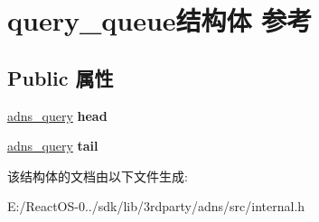 \hypertarget{structquery__queue}{}\section{query\+\_\+queue结构体 参考}
\label{structquery__queue}
\subsection*{Public 属性}
\begin{DoxyCompactItemize}
\item 
\mbox{\label{structquery__queue_a4590cbaffc45be372c9bc08a0864f5cc}} 
\hyperlink{structadns____query}{adns\+\_\+query} {\bfseries head}
\item 
\mbox{\label{structquery__queue_a06625477ee60232d5785b3bed7b23947}} 
\hyperlink{structadns____query}{adns\+\_\+query} {\bfseries tail}
\end{DoxyCompactItemize}


该结构体的文档由以下文件生成\+:\begin{DoxyCompactItemize}
\item 
E\+:/\+React\+O\+S-\/0../sdk/lib/3rdparty/adns/src/internal.\+h\end{DoxyCompactItemize}
